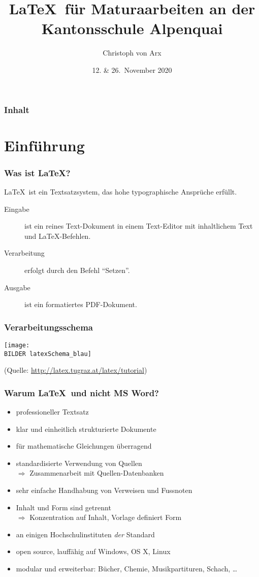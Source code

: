 \documentclass[11pt,german,aspectratio=169]{beamer}
\title{ \LaTeX\ für Maturaarbeiten an der \\Kantonsschule Alpenquai\\
}
\author{Christoph von Arx}
\date{12. \& 26. \,November 2020	}
\def\BILDER{../Bilder/} %
\begin{document}
\frame{\titlepage}   %

\begin{frame}
\frametitle{Inhalt}  %
\tableofcontents
\end{frame}

\section{Einführung} %
\frame
{
	\frametitle{Was ist \LaTeX ?}
	\LaTeX\ ist ein Textsatzsystem, das hohe typographische Ansprüche erfüllt.

\begin{center}
		\parbox[c]{0.98\textwidth}
		{\begin{description}
	\item[Eingabe]ist ein reines Text-Dokument in einem Text-Editor mit inhaltlichem Text und \LaTeX-Befehlen.
	\item[Verarbeitung]erfolgt durch den Befehl \enquote{Setzen}.
	\item[Ausgabe]ist ein formatiertes PDF-Dokument.
\end{description}
}
\end{center}
}

\frame
{
	\frametitle{Verarbeitungsschema}
	 	\begin{center}
	 \texttt{[image: \\BILDER latexSchema\_blau]}
	 	\end{center}
		\vfill
{\tiny (Quelle: \url{http://latex.tugraz.at/latex/tutorial})}
}


\frame
{
  \frametitle{Warum \LaTeX\ und nicht MS Word?}
\begin{itemize}
	\item professioneller Textsatz
	\item klar und einheitlich strukturierte Dokumente
	\item für mathematische Gleichungen überragend
	\item standardisierte Verwendung von Quellen  \\$ \Rightarrow$ Zusammenarbeit mit Quellen-Datenbanken
	\item sehr einfache Handhabung von Verweisen und Fussnoten
	\item Inhalt und Form sind getrennt \\$ \Rightarrow$ Konzentration auf Inhalt, Vorlage definiert Form
	\item an einigen Hochschulinstituten \emph{der} Standard
	\item open source, lauffähig auf Windows, OS X, Linux
	\item modular und erweiterbar: Bücher, Chemie, Musikpartituren, Schach, \dots
\end{itemize}
}
\end{document}
